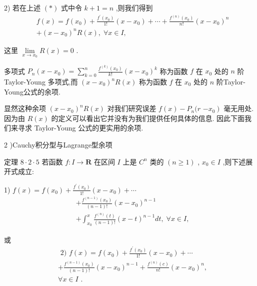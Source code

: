 2) 若在上述 $\left( *\right)$ 式中令 $k + 1 = n$ ,则我们得到
\begin{align*}
	&f\left( x\right)  = f\left( {x}_{0}\right)  + \frac{{f}^{\prime }\left( {x}_{0}\right) }{1!}\left( {x - {x}_{0}}\right)  + \cdots  + \frac{{f}^{\left( n\right) }\left( {x}_{0}\right) }{n!}{\left( x - {x}_{0}\right) }^{n}\\
	&+ {\left( x - {x}_{0}\right) }^{n}R\left( x\right) ,\;\forall x \in  I,
\end{align*}

这里 $\mathop{\lim }\limits_{{x \rightarrow  {x}_{0}}}R\left( x\right)  = 0$ .

多项式 ${P}_{n}\left( {x - {x}_{0}}\right)  = \mathop{\sum }\limits_{{k = 0}}^{n}\frac{{f}^{\left( k\right) }\left( {x}_{0}\right) }{k!}{\left( x - {x}_{0}\right) }^{k}$ 称为函数 $f$ 在 ${x}_{0}$ 处的 $n$ 阶 Taylor-Young 多项式,而 ${\left( x - {x}_{0}\right) }^{n}R\left( x\right)$ 称为函数 $f$ 在 ${x}_{0}$ 处的 $n$ 阶Taylor-Young公式的余项.

显然这种余项 ${\left( x - {x}_{0}\right) }^{n}R\left( x\right)$ 对我们研究误差 $f\left( x\right)  - {P}_{n}(r$  $\left. {-{x}_{0}}\right)$ 毫无用处. 因为由 $R\left( x\right)$ 的定义可以看出它并没有为我们提供任何具体的信息. 因此下面我们来寻求 Taylor-Young 公式的更实用的余项.

2 )Cauchy积分型与Lagrange型余项

定理 $8 \cdot  2 \cdot  5$ 若函数 $f : I \rightarrow  \mathbf{R}$ 在区间 $I$ 上是 ${C}^{n}$ 类的 $\left( {n \geq  1}\right)$ , ${x}_{0} \in  I$ ,则下述展开式成立:

1) $f\left( x\right)  = f\left( {x}_{0}\right)  + \frac{{f}^{\prime }\left( {x}_{0}\right) }{1!}\left( {x - {x}_{0}}\right)  + \cdots$
\begin{align*}
	&+ \frac{{f}^{\left( n - 1\right) }\left( {x}_{0}\right) }{\left( {n - 1}\right) !}{\left( x - {x}_{0}\right) }^{n - 1}\\
	&+ {\int }_{{x}_{0}}^{x}\frac{{f}^{\left( n\right) }\left( t\right) }{\left( {n - 1}\right) !}{\left( x - t\right) }^{n - 1}{dt},\;\forall x \in  I,
\end{align*}

或
\begin{align*}
	&\text{ 2) }f\left( x\right)  = f\left( {x}_{0}\right)  + \frac{{f}^{\prime }\left( {x}_{0}\right) }{1!}\left( {x - {x}_{0}}\right)  + \cdots\\
	&+ \frac{{f}^{\left( n - 1\right) }\left( {x}_{0}\right) }{\left( {n - 1}\right) !}{\left( x - {x}_{0}\right) }^{n - 1} + \frac{{f}^{\left( n\right) }\left( c\right) }{n!}{\left( x - {x}_{0}\right) }^{n},\\
	&\forall x \in  I\text{ . }
\end{align*}

